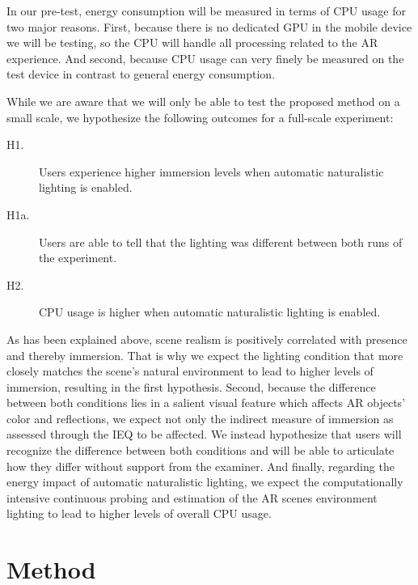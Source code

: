 \documentclass[12pt,twoside,english]{article}
\begin{document}
In our pre-test, energy consumption will be measured in terms of \gls{CPU} usage for two major reasons.
First, because there is no dedicated \gls{GPU} in the mobile device we will be testing, so the \gls{CPU} will handle all processing related to the \gls{AR} experience.
And second, because CPU usage can very finely be measured on the test device in contrast to general energy consumption.

While we are aware that we will only be able to test the proposed method on a small scale, we hypothesize the following outcomes for a full-scale experiment:

\begin{description}
    \item[H1.] Users experience higher immersion levels when automatic naturalistic lighting is enabled.
    \item[H1a.] Users are able to tell that the lighting was different between both runs of the experiment.
    \item[H2.] \gls{CPU} usage is higher when automatic naturalistic lighting is enabled.
\end{description}

As has been explained above, scene realism is positively correlated with presence and thereby immersion.
That is why we expect the lighting condition that more closely matches the scene's natural environment to lead to higher levels of immersion, resulting in the first hypothesis.
Second, because the difference between both conditions lies in a salient visual feature which affects \gls{AR} objects' color and reflections, we expect not only the indirect measure of immersion as assessed through the \gls{IEQ} to be affected.
We instead hypothesize that users will recognize the difference between both conditions and will be able to articulate how they differ without support from the examiner.
And finally, regarding the energy impact of automatic naturalistic lighting, we expect the computationally intensive continuous probing and estimation of the \gls{AR} scenes environment lighting to lead to higher levels of overall \gls{CPU} usage.


\section{Method}
\label{sect:method}
\end{document}
